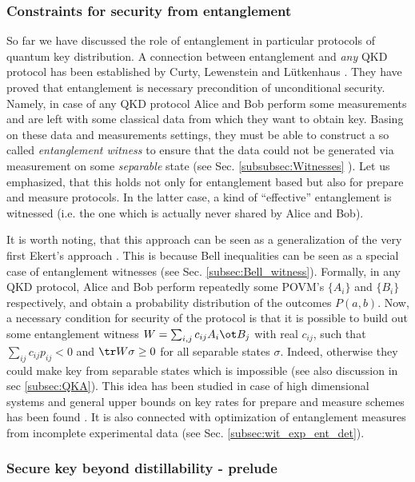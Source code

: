 \documentclass[twocolumn,aps,rmp]{revtex4}
\begin{document}
\subsubsection{Constraints for security from entanglement}

So far we have discussed the role of entanglement in particular protocols of quantum
key distribution. A connection between entanglement and {\it any} QKD protocol has been established by Curty, Lewenstein and L{\"u}tkenhaus \cite{CurtyLewLut}. They have proved that entanglement is necessary precondition of unconditional security. Namely, in case of any QKD protocol Alice and Bob perform some measurements and are left with some classical data from which they want to obtain key. Basing on these data and measurements settings, they must be able to construct a so called {\it entanglement witness} to ensure that the data could not be generated via measurement on some {\it separable} state (see Sec. \ref{subsubsec:Witnesses} ). Let us emphasized, that this holds not only for entanglement based but also for prepare and measure protocols. In the latter case, a kind of ``effective''  entanglement is witnessed (i.e. the one which is actually never shared by Alice and Bob).

It is worth noting, that this approach can be seen as a generalization of
the very first Ekert's approach \cite{E91}. This is because Bell
inequalities can be seen as a special case of entanglement witnesses
(see Sec. \ref{subsec:Bell_witness}). Formally, in any QKD protocol,
Alice and Bob perform repeatedly some POVM's $\{ A_i\}$ and $\{B_i\}$ respectively,
and obtain a probability distribution of the outcomes $P(a,b)$. Now, a necessary condition
for security of the protocol is that it is possible to build out some
entanglement witness $W=\sum_{i,j} c_{ij} A_i\ot B_j$ with real $c_{ij}$, such that
$\sum_{ij}c_{ij}p_{ij} <0$ and ${\tr}W\sigma \geq 0$ for all
separable states $\sigma$. Indeed, otherwise they could make key from
separable states which is impossible \cite{GisinWolf_linking} (see
also discussion in sec \ref{subsec:QKA}). This idea has been studied
in case of high dimensional systems
\cite{NikolopulosAlber05,NikolKhaliqueAlber05} and general upper
bounds on key rates for prepare and measure schemes has been found
\cite{MoroderCL2005-povmintr,symmetric_key_bound}. It is also
connected with optimization of entanglement measures from incomplete
experimental data (see Sec. \ref{subsec:wit_exp_ent_det}).

\subsubsection{Secure key beyond distillability - prelude}
\end{document}
